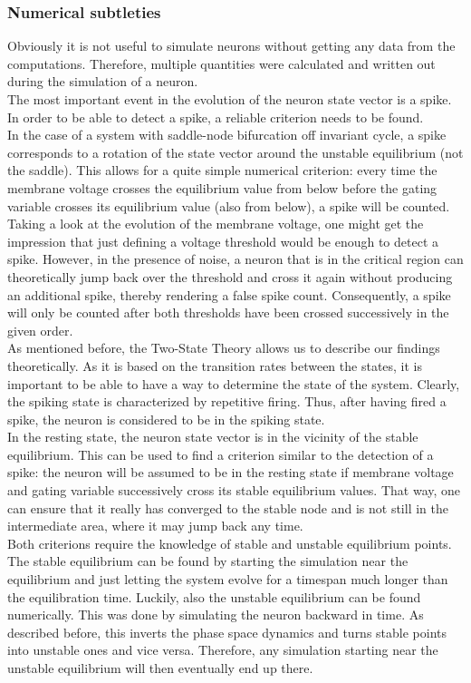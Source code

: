 \documentclass[12pt,a4paper]{article}
\begin{document}
\subsubsection{Numerical subtleties}
Obviously it is not useful to simulate neurons without getting any data from the computations. Therefore, multiple quantities were calculated and written out during the simulation of a neuron. \\
The most important event in the evolution of the neuron state vector is a spike. In order to be able to detect a spike, a reliable criterion needs to be found.\\
In the case of a system with saddle-node bifurcation off invariant cycle, a spike corresponds to a rotation of the state vector around the unstable equilibrium (not the saddle). This allows for a quite simple numerical criterion: every time the membrane voltage crosses the equilibrium value from below before the gating variable crosses its equilibrium value (also from below), a spike will be counted. Taking a look at the evolution of the membrane voltage, one might get the impression that just defining a voltage threshold would be enough to detect a spike. However, in the presence of noise, a neuron that is in the critical region can theoretically jump back over the threshold and cross it again without producing an additional spike, thereby rendering a false spike count. Consequently, a spike will only be counted after both thresholds have been crossed successively in the given order.\\
As mentioned before, the Two-State Theory allows us to describe our findings theoretically. As it is based on the transition rates between the states, it is important to be able to have a way to determine the state of the system. Clearly, the spiking state is characterized by repetitive firing. Thus, after having fired a spike, the neuron is considered to be in the spiking state. \\
In the resting state, the neuron state vector is in the vicinity of the stable equilibrium. This can be used to find a criterion similar to the detection of a spike: the neuron will be assumed to be in the resting state if membrane voltage and gating variable successively cross its stable equilibrium values. That way, one can ensure that it really has converged to the stable node and is not still in the intermediate area, where it may jump back any time. \\
Both criterions require the knowledge of stable and unstable equilibrium points. The stable equilibrium can be found by starting the simulation near the equilibrium and just letting the system evolve for a timespan much longer than the equilibration time. Luckily, also the unstable equilibrium can be found numerically. This was done by simulating the neuron backward in time. As described before, this inverts the phase space dynamics and turns stable points into unstable ones and vice versa. Therefore, any simulation starting near the unstable equilibrium will then eventually end up there.
\end{document}
